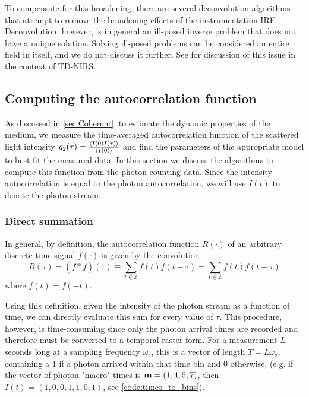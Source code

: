 To compensate for this broadening, there are several deconvolution algorithms that attempt to remove the broadening effects of the instrumentation IRF. Deconvolution, however, is in general an ill-posed inverse problem that does not have a unique solution. Solving ill-posed problems can be considered an entire field in itself, and we do not discuss it further. See \cite[ch. 20]{Handbook} for discussion of this issue in the context of TD-NIRS.  

\subsection{Computing the autocorrelation function} \label{sec:acf_comp}
As discussed in \autoref{sec:Coherent}, to estimate the dynamic properties of the medium, we measure the time-averaged autocorrelation function of the scattered light intensity $g_2(\tau) = \frac{\expval{I(0)I(\tau)}} {\expval{I(0)}}$ and find the parameters of the appropriate model to best fit the measured data. In this section we discuss the algorithms to compute this function from the photon-counting data. Since the intensity autocorrelation is equal to the photon autocorrelation, we will use $I(t)$ to denote the photon stream.

\subsubsection{Direct summation}
In general, by definition, the autocorrelation function $R(\cdot)$ of an arbitrary discrete-time signal $f(\cdot)$ is given by the convolution
\begin{equation} \label{eq:acor_def}
R(\tau) = (f*\bar{f})(\tau) 
        \equiv \sum_{t\in\mathbb{Z}}f(t)\bar{f}(t-\tau) 
        = \sum_{t\in\mathbb{Z}}f(t)f(t+\tau) 
\end{equation}
where $\bar{f}(t) = f(-t)$.

Using this definition, given the intensity of the photon stream as a function of time, we can directly evaluate this sum for every value of $\tau$. This procedure, however, is time-consuming since only the photon arrival times are recorded and therefore must be converted to a temporal-raster form. For a measurement $L$ seconds long at a sampling frequency $\omega_s$, this is a vector of length $T = L\omega_s$, containing a 1 if a photon arrived within that time bin and 0 otherwise, (e.g. if the vector of photon "macro" times is $\vb{m} = (1,4,5,7)$, then $I(t) = (1,0,0,1,1,0,1)$, see \autoref{code:times_to_bins}). 

